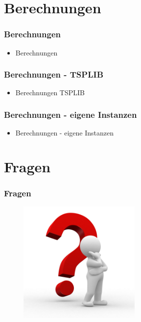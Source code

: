 \documentclass[12pt]{beamer}
\begin{document}
    \section{Berechnungen}
    \begin{frame}
        \frametitle{Berechnungen}
	    \begin{itemize}
                \item Berechnungen
            \end{itemize}
    \end{frame}
    \begin{frame}
        \frametitle{Berechnungen - TSPLIB}
	    \begin{itemize}
                \item Berechnungen TSPLIB
            \end{itemize}
    \end{frame}
    \begin{frame}
        \frametitle{Berechnungen - eigene Instanzen}
	    \begin{itemize}
                \item Berechnungen - eigene Instanzen
            \end{itemize}
    \end{frame}

    \section{Fragen}
    \begin{frame}
    \frametitle{Fragen}
        \begin{figure}[H]
	    \centering
	        \includegraphics[width=6cm]{gfx/questionmark}
        \end{figure}
    \end{frame}
\end{document}
